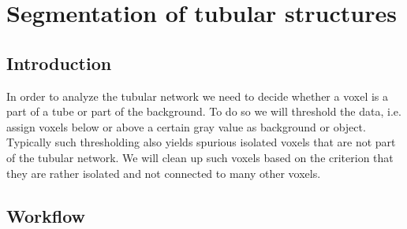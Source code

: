 \section{Segmentation of tubular structures}

\subsection{Introduction}
In order to analyze the tubular network we need to decide whether a voxel is a part of a tube or part of the background. To do so we will threshold the data, i.e. assign voxels below or above a certain gray value as background or object. Typically such thresholding also yields spurious isolated voxels that are not part of the tubular network. We will clean up such voxels based on the criterion that they are rather isolated and not connected to many other voxels.

\subsection{Workflow}

